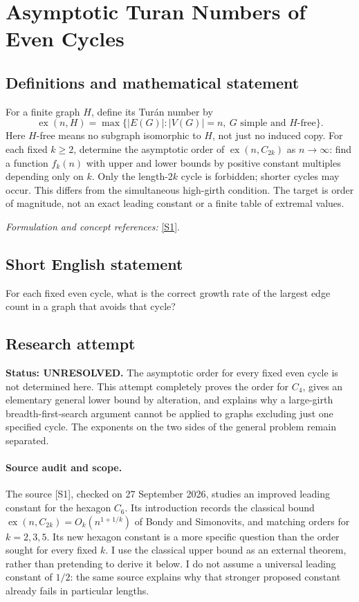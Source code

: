 \documentclass[11pt]{article}
\begin{document}
\section*{\texorpdfstring{Asymptotic Turan Numbers of Even Cycles}{Asymptotic Turan Numbers of Even Cycles}}\label{362}
\subsection{Definitions and mathematical statement}
For a finite graph $H$, define its Tur\'an number by
\[
 \operatorname{ex}(n,H)=\max\{|E(G)|:|V(G)|=n,\ G\text{ simple and }H\text{-free}\}.
\]
Here $H$-free means no subgraph isomorphic to $H$, not just no induced copy. For each fixed $k\ge2$, determine the asymptotic order of $\operatorname{ex}(n,C_{2k})$ as $n\to\infty$: find a function $f_k(n)$ with upper and lower bounds by positive constant multiples depending only on $k$. Only the length-$2k$ cycle is forbidden; shorter cycles may occur. This differs from the simultaneous high-girth condition. The target is order of magnitude, not an exact leading constant or a finite table of extremal values.
\par\smallskip\textit{Formulation and concept references:} \href{https://arxiv.org/html/2609.10003}{[S1]}.

\subsection{Short English statement}
For each fixed even cycle, what is the correct growth rate of the largest edge count in a graph that avoids that cycle?
\subsection{Research attempt}
\textbf{Status: UNRESOLVED.} The asymptotic order for every fixed even cycle is not determined here. This attempt completely proves the order for $C_4$, gives an elementary general lower bound by alteration, and explains why a large-girth breadth-first-search argument cannot be applied to graphs excluding just one specified cycle. The exponents on the two sides of the general problem remain separated.

\paragraph{Source audit and scope.}
The source [S1], checked on 27 September 2026, studies an improved leading constant for the hexagon $C_6$. Its introduction records the classical bound $\operatorname{ex}(n,C_{2k})=O_k(n^{1+1/k})$ of Bondy and Simonovits, and matching orders for $k=2,3,5$. Its new hexagon constant is a more specific question than the order sought for every fixed $k$. I use the classical upper bound as an external theorem, rather than pretending to derive it below. I do not assume a universal leading constant of $1/2$: the same source explains why that stronger proposed constant already fails in particular lengths.
\end{document}
